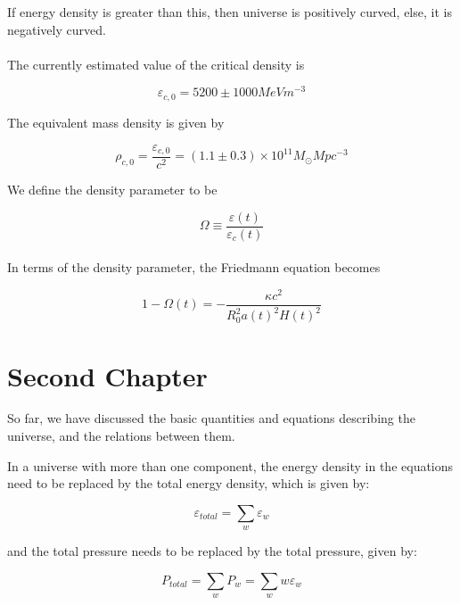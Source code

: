 \documentclass[a4,12pt,oneside]{report}
\begin{document}
    If energy density is greater than this, then universe is positively curved, else, it is negatively curved. 
    \\ \\
    The currently estimated value of the critical density is 
    
    \begin{equation}
	    \varepsilon_{c,0} = 5200 \pm 1000 MeV m^{-3}
    \end{equation}
    
    The equivalent mass density is given by
    
    \begin{equation}
	    \rho_{c,0}= \frac{\varepsilon_{c,0}}{c^2} = (1.1 \pm 0.3) \times 10^{11} M_\odot Mpc^{-3}
    \end{equation}
    
    We define the density parameter to be 
    
   \begin{equation}
	   \Omega \equiv \frac{\varepsilon(t)}{\varepsilon_c(t)}
   \end{equation}
   \\
  
   In terms of the density parameter, the Friedmann equation becomes
   
   \begin{equation}
	   1-\Omega(t) = -\frac{\kappa c^2}{R_0^2 a(t)^2 H(t)^2}
   \end{equation}
   
   \chapter{Second Chapter}
   
   So far, we have discussed the basic quantities and equations describing the universe, and the relations between them.
   
   In a universe with more than one component, the energy density in the equations need to be replaced by the total energy density, which is given by:
   
   \begin{equation}
	   \varepsilon_{total} = \sum_{w} \varepsilon_w
   \end{equation}
   
   and the total pressure needs to be replaced by the total pressure, given by:
   
   \begin{equation}
	   P_{total}=\sum_{w} P_w = \sum_{w} w\varepsilon_w
   \end{equation}
   
\end{document}
